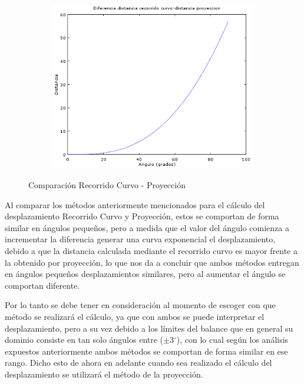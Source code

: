 \documentclass[12pt,a4paper]{article}
\newcommand{\grad}{$^{\circ}$}
\begin{document}
\begin{figure}[H]
\begin{subfigure}{.5\textwidth}
	\end{subfigure}
	\begin{subfigure}{.5\textwidth}
		\includegraphics[width=.9\linewidth]{images/DiferenciaRec-Pro}
		\label{fig:comparacionDesplazamiento}
	\end{subfigure}%
		\captionsetup{labelformat=andtable}
		\caption{Comparación Recorrido Curvo - Proyección}
\end{figure}

Al comparar los métodos anteriormente mencionados para el cálculo del desplazamiento Recorrido Curvo y Proyección, estos se comportan de forma similar en ángulos pequeños, pero a medida que el valor del ángulo comienza a incrementar la diferencia generar una curva exponencial el desplazamiento, debido a que la distancia calculada mediante el recorrido curvo es mayor frente a la obtenido por proyección, lo que nos da a concluir que ambos métodos entregan en ángulos pequeños desplazamientos similares, pero al aumentar el ángulo se comportan diferente.

Por lo tanto se debe tener en consideración al momento de escoger con que método se realizará el cálculo, ya que con ambos se puede interpretar el desplazamiento, pero a su vez debido a los límites del balance que en general su dominio consiste en tan solo ángulos entre ($\pm 3$\grad), con lo cual según los análisis expuestos anteriormente ambos métodos se comportan de forma similar en ese rango.
Dicho esto de ahora en adelante cuando sea realizado el cálculo del desplazamiento se utilizará el método de la proyección.
\end{document}
